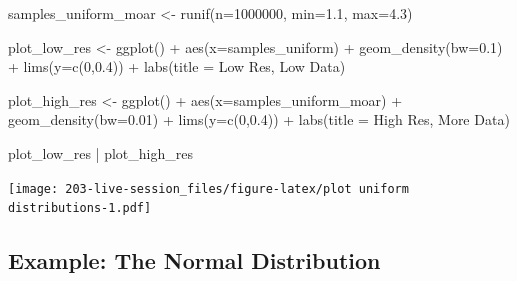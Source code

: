 \documentclass[
]{book}
\newenvironment{Shaded}{\begin{snugshade}}{\end{snugshade}}
\newcommand{\AttributeTok}[1]{\textcolor[rgb]{0.77,0.63,0.00}{#1}}
\newcommand{\DecValTok}[1]{\textcolor[rgb]{0.00,0.00,0.81}{#1}}
\newcommand{\FloatTok}[1]{\textcolor[rgb]{0.00,0.00,0.81}{#1}}
\newcommand{\FunctionTok}[1]{\textcolor[rgb]{0.00,0.00,0.00}{#1}}
\newcommand{\NormalTok}[1]{#1}
\newcommand{\OtherTok}[1]{\textcolor[rgb]{0.56,0.35,0.01}{#1}}
\newcommand{\SpecialCharTok}[1]{\textcolor[rgb]{0.00,0.00,0.00}{#1}}
\newcommand{\StringTok}[1]{\textcolor[rgb]{0.31,0.60,0.02}{#1}}
\theoremstyle{definition}
\theoremstyle{definition}
\theoremstyle{definition}
\theoremstyle{definition}
\theoremstyle{remark}
\begin{document}
\begin{Shaded}
\begin{Highlighting}[]
\NormalTok{samples\_uniform\_moar }\OtherTok{\textless{}{-}} \FunctionTok{runif}\NormalTok{(}\AttributeTok{n=}\DecValTok{1000000}\NormalTok{, }\AttributeTok{min=}\FloatTok{1.1}\NormalTok{, }\AttributeTok{max=}\FloatTok{4.3}\NormalTok{)}
\end{Highlighting}
\end{Shaded}

\begin{Shaded}
\begin{Highlighting}[]
\NormalTok{plot\_low\_res }\OtherTok{\textless{}{-}} \FunctionTok{ggplot}\NormalTok{()  }\SpecialCharTok{+} 
  \FunctionTok{aes}\NormalTok{(}\AttributeTok{x=}\NormalTok{samples\_uniform)  }\SpecialCharTok{+} 
  \FunctionTok{geom\_density}\NormalTok{(}\AttributeTok{bw=}\FloatTok{0.1}\NormalTok{)    }\SpecialCharTok{+} 
  \FunctionTok{lims}\NormalTok{(}\AttributeTok{y=}\FunctionTok{c}\NormalTok{(}\DecValTok{0}\NormalTok{,}\FloatTok{0.4}\NormalTok{))        }\SpecialCharTok{+} 
  \FunctionTok{labs}\NormalTok{(}\AttributeTok{title =} \StringTok{\textquotesingle{}Low Res, Low Data\textquotesingle{}}\NormalTok{)}

\NormalTok{plot\_high\_res }\OtherTok{\textless{}{-}} \FunctionTok{ggplot}\NormalTok{()     }\SpecialCharTok{+} 
  \FunctionTok{aes}\NormalTok{(}\AttributeTok{x=}\NormalTok{samples\_uniform\_moar) }\SpecialCharTok{+} 
  \FunctionTok{geom\_density}\NormalTok{(}\AttributeTok{bw=}\FloatTok{0.01}\NormalTok{)       }\SpecialCharTok{+} 
  \FunctionTok{lims}\NormalTok{(}\AttributeTok{y=}\FunctionTok{c}\NormalTok{(}\DecValTok{0}\NormalTok{,}\FloatTok{0.4}\NormalTok{))            }\SpecialCharTok{+} 
  \FunctionTok{labs}\NormalTok{(}\AttributeTok{title =} \StringTok{\textquotesingle{}High Res, More Data\textquotesingle{}}\NormalTok{)}

\NormalTok{plot\_low\_res }\SpecialCharTok{|}\NormalTok{ plot\_high\_res}
\end{Highlighting}
\end{Shaded}

\texttt{[image: 203-live-session\_files/figure-latex/plot uniform distributions-1.pdf]}

\hypertarget{example-the-normal-distribution}{%
\subsection{Example: The Normal Distribution}\label{example-the-normal-distribution}}
\end{document}
